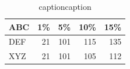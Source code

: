 \begin{table}[H]
	\centering
	\def\arraystretch{0.66}
	\caption{captioncaption}	\label{obj_1_table_label}
	\scalebox{1}
	{		
		\begin{tabular}[H]{lrrrr}	\toprule
			\textbf{ABC}	&	\textbf{1\%}	&	\textbf{5\%}	&	\textbf{10\%}	&	\textbf{15\%}	\\ \midrule
			DEF									&	21	&	101	&	115		&	135		\\
			XYZ			&	21	&	101	&	105		&	112		\\
			\bottomrule
		\end{tabular}
	}
\end{table}
